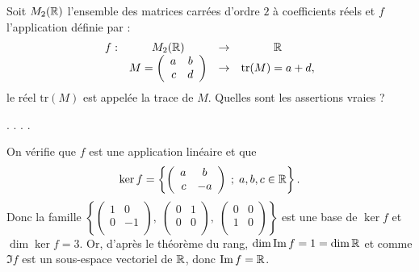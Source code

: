 \begin{question}
Soit $ M_2(\mathbb{R})$ l'ensemble des matrices carrées d'ordre $2$ à coefficients réels et $f$ l'application  définie par :
$$\begin{array}{rccc}f:&M_2(\mathbb{R})&\to& \mathbb{R}\\
& M = \left(\begin{array}{rc} a&b\\
c&d\\  \end{array}\right) &\to &\mbox{tr}(M) = a+d, \end{array}$$
le réel $\mbox{tr}(M)$ est appelée la trace de $M$. Quelles sont les assertions vraies ?
\begin{answers}  
.
.
.
.    
\end{answers}
\begin{explanations} On vérifie que $f$ est une application linéaire et que
$$\ker f= \left\{\left(\begin{array}{rc}
a&b\\c&-a\\ \end{array}\right)\; ;\; a,b,c \in \mathbb{R} \right\}.$$
Donc la famille $\left\{\left(\begin{array}{rc}
1&0\\ 0&-1\\ \end{array}\right), \;  \left(\begin{array}{rc}
0&1\\ 0&0\\ \end{array}\right), \; \left(\begin{array}{rc}
0&0\\ 1&0\\ \end{array}\right) \right\}$ est une base de $\ker f$ et $\dim \ker f=3$. Or, d'après le théorème du rang, $\dim \mathop{\mathrm{Im}}\nolimits f=1=\dim \mathbb{R}$ et comme $\Im f$ est un sous-espace vectoriel de $\mathbb{R}$, donc $\mathop{\mathrm{Im}}\nolimits f=\mathbb{R}$.
\end{explanations}
\end{question}

